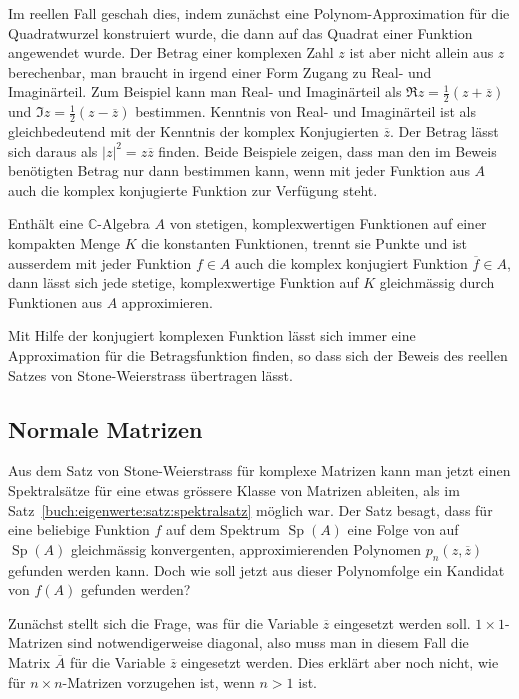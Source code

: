 Im reellen Fall geschah dies, indem zunächst eine Polynom-Approximation
für die Quadratwurzel konstruiert wurde, die dann auf das Quadrat einer
Funktion angewendet wurde.
Der Betrag einer komplexen Zahl $z$ ist aber nicht allein aus $z$
berechenbar, man braucht in irgend einer Form Zugang zu Real-
und Imaginärteil.
Zum Beispiel kann man Real- und Imaginärteil als
$\Re z= \frac12(z+\overline{z})$ und $\Im z = \frac12(z-\overline{z})$
bestimmen.
Kenntnis von Real- und Imaginärteil ist als gleichbedeutend mit
der Kenntnis der komplex Konjugierten $\overline{z}$.
Der Betrag lässt sich daraus als $|z|^2 = z\overline{z}$ finden.
Beide Beispiele zeigen, dass man den im Beweis benötigten Betrag
nur dann bestimmen kann, wenn mit jeder Funktion aus $A$ auch die
komplex konjugierte Funktion zur Verfügung steht.

\begin{satz}
Enthält eine $\mathbb{C}$-Algebra $A$ von stetigen, komplexwertigen
Funktionen auf einer kompakten Menge $K$ die konstanten Funktionen,
trennt sie Punkte und ist ausserdem mit jeder Funktion $f\in A$ auch
die komplex konjugiert Funktion $\overline{f}\in A$,
dann lässt sich jede stetige, komplexwertige Funktion 
auf $K$ gleichmässig durch Funktionen aus $A$ approximieren.
\end{satz}

Mit Hilfe der konjugiert komplexen Funktion lässt sich immer eine
Approximation für die Betragsfunktion finden, so dass sich der
Beweis des reellen Satzes von Stone-Weierstrass übertragen lässt.

%
%
\subsection{Normale Matrizen
\label{buch:subsection:normale-matrizen}}
Aus dem Satz von Stone-Weierstrass für komplexe Matrizen kann man
jetzt einen Spektralsätze für eine etwas grössere Klasse von Matrizen
ableiten, als im Satz~\ref{buch:eigenwerte:satz:spektralsatz}
möglich war.
Der Satz besagt, dass für eine beliebige Funktion $f$ auf dem Spektrum
$\operatorname{Sp}(A)$ eine Folge von auf $\operatorname{Sp}(A)$
gleichmässig konvergenten, approximierenden Polynomen
$p_n(z,\overline{z})$ gefunden werden kann.
Doch wie soll jetzt aus dieser Polynomfolge ein Kandidat von $f(A)$
gefunden werden?

Zunächst stellt sich die Frage, was für die Variable $\overline{z}$ 
eingesetzt werden soll.
$1\times 1$-Matrizen sind notwendigerweise diagonal, also muss 
man in diesem Fall die Matrix $\overline{A}$ für die Variable
$\overline{z}$ eingesetzt werden.
Dies erklärt aber noch nicht, wie für $n\times n$-Matrizen
vorzugehen ist, wenn $n>1$ ist.

